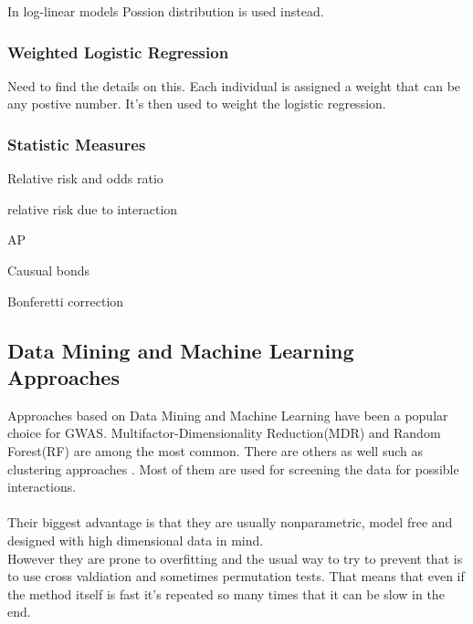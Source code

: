 \documentclass[10pt,a4paper]{article}
\begin{document}
In log-linear models Possion distribution is used instead. \cite{agresti_categorical}

\subsubsection{Weighted Logistic Regression}
Need to find the details on this. Each individual is assigned a weight that can be any postive number. It's then used to weight the logistic regression.

\subsubsection{Statistic Measures}

Relative risk and odds ratio\cite{agresti_categorical}

relative risk due to interaction

AP

Causual bonds

Bonferetti correction

\subsection{Data Mining and Machine Learning Approaches}
\label{data_machine_learning}
Approaches based on Data Mining and Machine Learning have been a popular choice for GWAS. Multifactor-Dimensionality Reduction(MDR)\cite{mdr_2001} and Random Forest(RF)\cite{random_forest} are among the most common\cite{gene_enviroment_2013,cordell_detect_review}. There are others as well such as clustering approaches \cite{fast_high_order_cluster}. Most of them are used for screening the data for possible interactions\cite{gene_enviroment_2013,cordell_detect_review}.\\
\\
Their biggest advantage is that they are usually nonparametric, model free and designed with high dimensional data in mind.
\\
However they are prone to overfitting and the usual way to try to prevent that is to use cross valdiation and sometimes permutation tests. That means that even if the method itself is fast it's repeated so many times that it can be slow in the end\cite{cordell_detect_review}.
\end{document}
